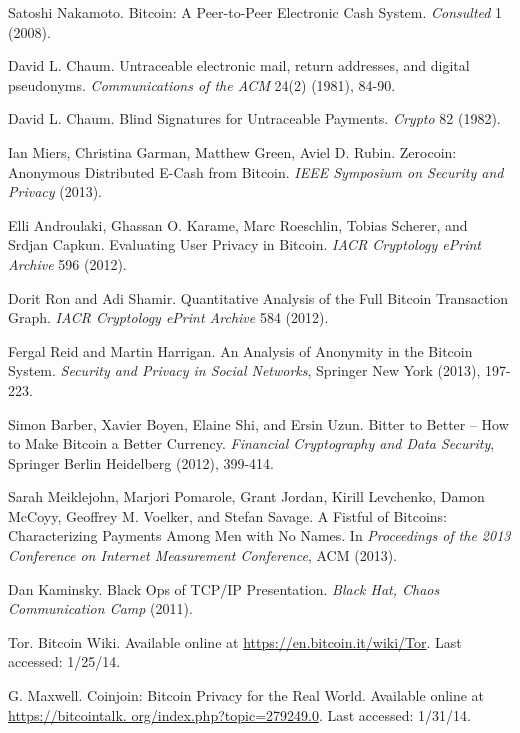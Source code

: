 \documentclass[conference]{IEEEtran}
\begin{document}
\begin{thebibliography}{1}

 Satoshi Nakamoto. Bitcoin: A Peer-to-Peer Electronic Cash System. \emph{Consulted} 1 (2008).

 David L. Chaum. Untraceable electronic mail, return addresses, and digital pseudonyms. \emph{Communications of the ACM} 24(2) (1981), 84-90.

 David L. Chaum. Blind Signatures for Untraceable Payments. \emph{Crypto} 82 (1982).

 Ian Miers, Christina Garman, Matthew Green, Aviel D. Rubin. Zerocoin: Anonymous Distributed E-Cash from Bitcoin. \emph{IEEE Symposium on Security and Privacy} (2013).

 Elli Androulaki, Ghassan O. Karame, Marc Roeschlin, Tobias Scherer, and Srdjan Capkun. Evaluating User Privacy in Bitcoin. \emph{IACR Cryptology ePrint Archive} 596 (2012).

 Dorit Ron and Adi Shamir. Quantitative Analysis of the Full Bitcoin Transaction Graph. \emph{IACR Cryptology ePrint Archive} 584 (2012).

 Fergal Reid and Martin Harrigan. An Analysis of Anonymity in the Bitcoin System. \emph{Security and Privacy in Social Networks}, Springer New York (2013), 197-223.

 Simon Barber, Xavier Boyen, Elaine Shi, and Ersin Uzun. Bitter to Better -- How to Make Bitcoin a Better Currency. \emph{Financial Cryptography and Data Security}, Springer Berlin Heidelberg (2012), 399-414.

 Sarah Meiklejohn, Marjori Pomarole, Grant Jordan, Kirill Levchenko, Damon McCoyy, Geoffrey M. Voelker, and  Stefan Savage. A Fistful of Bitcoins: Characterizing Payments Among Men with No Names. In \emph{Proceedings of the 2013 Conference on Internet Measurement Conference}, ACM (2013).

 Dan Kaminsky. Black Ops of TCP/IP Presentation. \emph{Black Hat, Chaos Communication
Camp} (2011).

 Tor. Bitcoin Wiki. Available online at \url{https://en.bitcoin.it/wiki/Tor}. Last accessed: 1/25/14.

 G. Maxwell. Coinjoin: Bitcoin Privacy for the Real World. Available online at \url{https://bitcointalk.
org/index.php?topic=279249.0}. Last accessed: 1/31/14.


\end{thebibliography}
\end{document}
